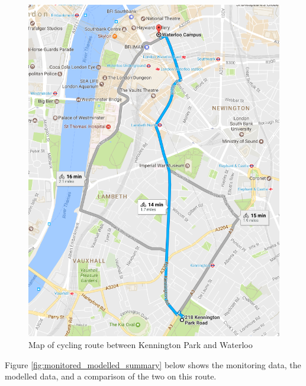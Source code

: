 \begin{figure}[H]
\centering
\includegraphics[scale=0.7]{images/cycling_journey.png}
\caption{Map of cycling route between Kennington Park and Waterloo}
\label{fig:cycling_journey}
\end{figure}

Figure \ref{fig:monitored_modelled_summary} below shows the monitoring data, the modelled data, and a comparison of the two on this route.

